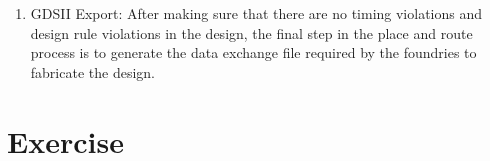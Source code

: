 \documentclass[a4paper,11pt]{article}%
\begin{document}
\begin{enumerate}[1.)]
	\item GDSII Export: After making sure that there are no timing violations and design rule violations in the design, the final step in the place and route process is to generate the data exchange file required by the foundries to fabricate the design.
	
\end{enumerate} 

\section{Exercise}

\pagebreak
{\small


}
\end{document}
